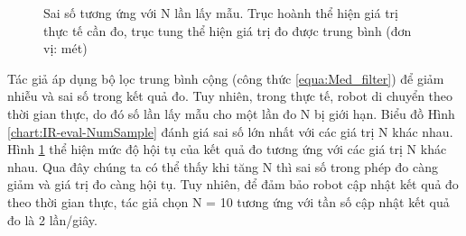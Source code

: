 \begin{figure}[htbp]
\centering
{}
\hspace{8pt}
    \caption[Sai số tương ứng với N lần lấy mẫu]{Sai số tương ứng với N lần lấy mẫu. Trục hoành thể hiện giá trị thực tế cần đo, trục tung thể hiện giá trị đo được trung bình (đơn vị: mét)}
    \label{fig:chart-IR-N-errorbar}
\end{figure}

Tác giả áp dụng bộ lọc trung bình cộng (công thức \ref{equa:Med_filter}) để giảm nhiễu và sai số trong kết quả đo. Tuy nhiên, trong thực tế, robot di chuyển theo thời gian thực, do đó số lần lấy mẫu cho một lần đo N bị giới hạn. Biểu đồ Hình \ref{chart:IR-eval-NumSample} đánh giá sai số lớn nhất với các giá trị N khác nhau. Hình \ref{fig:chart-IR-N-errorbar} thể hiện mức độ hội tụ của kết quả đo tương ứng với các giá trị N khác nhau. Qua đây chúng ta có thể thấy khi tăng N thì sai số trong phép đo càng giảm và giá trị đo càng hội tụ. Tuy nhiên, để đảm bảo robot cập nhật kết quả đo theo thời gian thực, tác giả chọn N = 10 tương ứng với tần số cập nhật kết quả đo là 2 lần/giây.

